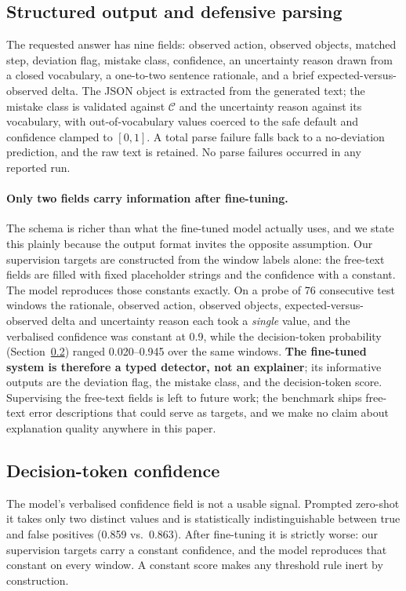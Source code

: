 \documentclass[10pt,twocolumn]{article}
\begin{document}
\subsection{Structured output and defensive parsing}

The requested answer has nine fields: observed action, observed objects, matched
step, deviation flag, mistake class, confidence, an uncertainty reason drawn from
a closed vocabulary, a one-to-two sentence rationale, and a brief
expected-versus-observed delta. The JSON object is extracted from the generated
text; the mistake class is validated against $\mathcal{C}$ and the uncertainty
reason against its vocabulary, with out-of-vocabulary values coerced to the safe
default and confidence clamped to $[0,1]$. A total parse failure falls back to a
no-deviation prediction, and the raw text is retained. No parse failures occurred
in any reported run.

\paragraph{Only two fields carry information after fine-tuning.} The schema is
richer than what the fine-tuned model actually uses, and we state this plainly
because the output format invites the opposite assumption. Our supervision
targets are constructed from the window labels alone: the free-text fields are
filled with fixed placeholder strings and the confidence with a constant. The
model reproduces those constants exactly. On a probe of 76 consecutive test
windows the rationale, observed action, observed objects, expected-versus-observed
delta and uncertainty reason each took a \emph{single} value, and the verbalised
confidence was constant at 0.9, while the decision-token probability
(Section~\ref{sec:confidence}) ranged 0.020--0.945 over the same windows.
\textbf{The fine-tuned system is therefore a typed detector, not an explainer};
its informative outputs are the deviation flag, the mistake class, and the
decision-token score. Supervising the free-text fields is left to future work;
the benchmark ships free-text error descriptions that could serve as targets, and we make no claim about explanation quality anywhere in this paper.

\subsection{Decision-token confidence}
\label{sec:confidence}

The model's verbalised confidence field is not a usable signal. Prompted
zero-shot it takes only two distinct values and is statistically indistinguishable
between true and false positives (0.859 vs.\ 0.863). After fine-tuning it is
strictly worse: our supervision targets carry a constant confidence, and the
model reproduces that constant on every window. A constant score makes any
threshold rule inert by construction.
\end{document}
